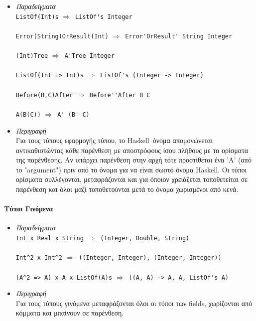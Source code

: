 \documentclass[diploma]{softlab-thesis}
\def\H{Haskell}
\def\lra{$\Longrightarrow$\ }
\begin{document}
\begin{itemize}
\item
\textit{Παραδείγματα}\\

\verb|ListOf(Int)s| \lra \verb|ListOf's Integer|\\\\
\verb|Error(String)OrResult(Int)| \lra \verb|Error'OrResult' String Integer|\\\\
\verb|(Int)Tree| \lra \verb|A'Tree Integer|\\\\
\verb|ListOf(Int => Int)s| \lra \verb|ListOf's (Integer -> Integer)|\\\\
\verb|Before(B,C)After| \lra \verb|Before''After B C|\\\\
\verb|A(B(C))| \lra \verb|A' (B' C)|\\

\item
\textit{Περιγραφή}\\

Για τους τύπους εφαρμογής τύπου, το \H\ όνομα απομονώνεται αντικαθιστώντας
κάθε παρένθεση με αποστρόφους ίσου πλήθους με τα ορίσματα της παρένθεσης.
Αν υπάρχει παρένθεση στην αρχή τότε προστίθεται ένα 'A' (από το "argument")
πριν από το όνομα για να είναι σωστό όνομα \H. Οι τύποι ορίσματα συλλέγονται,
μεταφράζονται και για όποιον χρειάζεται τοποθετείται σε παρένθεση και όλοι
μαζί τοποθετούνται μετά το όνομα χωρισμένοι από κενά.

\end{itemize}

\paragraph{Τύποι Γινόμενα}

\begin{itemize}
\item
\textit{Παραδείγματα}\\

\verb|Int x Real x String| \lra \verb|(Integer, Double, String)|\\\\
\verb|Int^2 x Int^2| \lra \verb|((Integer, Integer), (Integer, Integer))|\\\\
\verb|(A^2 => A) x A x ListOf(A)s| \lra \verb|((A, A) -> A, A, ListOf's A)|\\
\item
\textit{Περιγραφή}\\

Για τους τύπους γινόμενα μεταφράζονται όλοι οι τύποι των fields, χωρίζονται
από κόμματα και μπαίνουν σε παρένθεση.

\end{itemize}
\end{document}
